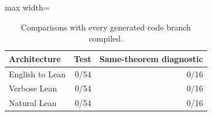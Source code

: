\begin{table}[htbp]
\centering
\caption{Comparisons with every generated code branch compiled.}
\label{tab:compiled-pairs}
\small
\begin{adjustbox}{max width=\textwidth}
\begin{tabular}{lrr}
\toprule
Architecture & Test & Same-theorem diagnostic \\
\midrule
English to Lean & 0/54 & 0/16 \\
Verbose Lean & 0/54 & 0/16 \\
Natural Lean & 0/54 & 0/16 \\
\bottomrule
\end{tabular}
\end{adjustbox}
\end{table}
